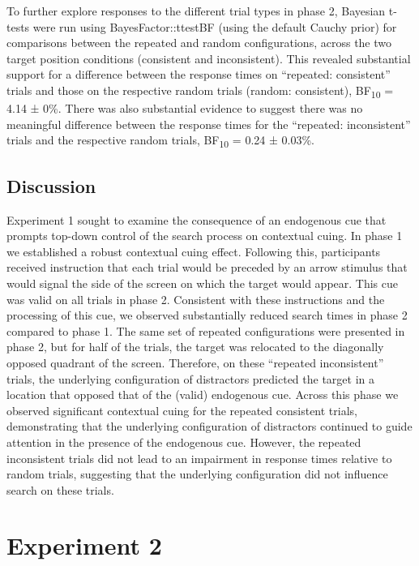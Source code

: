 \documentclass[
  man,floatsintext]{apa7}
\begin{document}
To further explore responses to the different trial types in phase 2, Bayesian t-tests were run using BayesFactor::ttestBF (using the default Cauchy prior) for comparisons between the repeated and random configurations, across the two target position conditions (consistent and inconsistent). This revealed substantial support for a difference between the response times on ``repeated: consistent'' trials and those on the respective random trials (random: consistent), BF\textsubscript{10} = 4.14 ± 0\%. There was also substantial evidence to suggest there was no meaningful difference between the response times for the ``repeated: inconsistent'' trials and the respective random trials, BF\textsubscript{10} = 0.24 ± 0.03\%.

\hypertarget{discussion}{%
\subsection{Discussion}\label{discussion}}

Experiment 1 sought to examine the consequence of an endogenous cue that prompts top-down control of the search process on contextual cuing. In phase 1 we established a robust contextual cuing effect. Following this, participants received instruction that each trial would be preceded by an arrow stimulus that would signal the side of the screen on which the target would appear. This cue was valid on all trials in phase 2. Consistent with these instructions and the processing of this cue, we observed substantially reduced search times in phase 2 compared to phase 1. The same set of repeated configurations were presented in phase 2, but for half of the trials, the target was relocated to the diagonally opposed quadrant of the screen. Therefore, on these ``repeated inconsistent'' trials, the underlying configuration of distractors predicted the target in a location that opposed that of the (valid) endogenous cue. Across this phase we observed significant contextual cuing for the repeated consistent trials, demonstrating that the underlying configuration of distractors continued to guide attention in the presence of the endogenous cue. However, the repeated inconsistent trials did not lead to an impairment in response times relative to random trials, suggesting that the underlying configuration did not influence search on these trials.

\hypertarget{experiment-2}{%
\section{Experiment 2}\label{experiment-2}}
\end{document}
